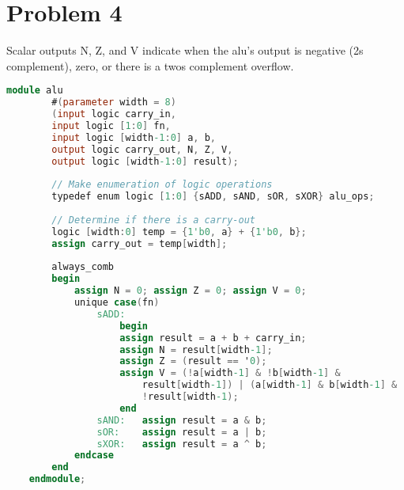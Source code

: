 \documentclass[a4paper, 12pt]{article}
\begin{document}
\newpage
\section{Problem 4}
Scalar outputs N, Z, and V indicate when the alu's output is negative (2s complement), zero, or there is a twos complement overflow. 

	\begin{mdframed}[backgroundcolor=code-gray, roundcorner=10pt,
								innerleftmargin=5, innertopmargin=5, innerbottommargin=5]	
	\begin{lstlisting}[language=Verilog, caption=ALU Module, tabsize=2, label={lst:init-hardware}]
	module alu
		#(parameter width = 8)
		(input logic carry_in,
		input logic [1:0] fn,
		input logic [width-1:0] a, b,
		output logic carry_out, N, Z, V,
		output logic [width-1:0] result);
		
		// Make enumeration of logic operations
		typedef enum logic [1:0] {sADD, sAND, sOR, sXOR} alu_ops;
		
		// Determine if there is a carry-out
		logic [width:0] temp = {1'b0, a} + {1'b0, b};
		assign carry_out = temp[width];
		
		always_comb
		begin
			assign N = 0; assign Z = 0; assign V = 0;
			unique case(fn)
				sADD:
					begin
					assign result = a + b + carry_in;
					assign N = result[width-1];
					assign Z = (result == '0);
					assign V = (!a[width-1] & !b[width-1] &
						result[width-1]) | (a[width-1] & b[width-1] &
						!result[width-1);
					end
				sAND:	assign result = a & b;
				sOR:	assign result = a | b;
				sXOR:	assign result = a ^ b;
			endcase
		end		
	endmodule;
	\end{lstlisting}
	\end{mdframed}
	
	
\end{document}
